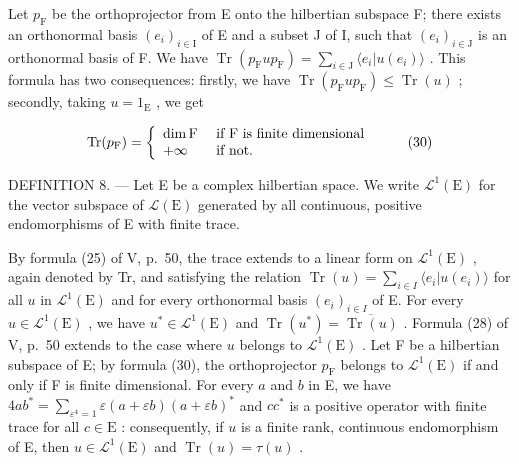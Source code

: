 Let \(p_{\mathrm{F}}\) be the orthoprojector from E onto the hilbertian subspace F; there exists an orthonormal basis \((e_i)_{i \in \mathrm{I}}\) of E and a subset J of I, such that \((e_i)_{i \in \mathrm{J}}\) is an orthonormal basis of F. We have \(\operatorname{Tr}(p_{\mathrm{F}} up_{\mathrm{F}}) = \sum_{i \in \mathrm{J}} \langle e_i | u(e_i) \rangle\) . This formula has two consequences: firstly, we have \(\operatorname{Tr}(p_{\mathrm{F}} up_{\mathrm{F}}) \leqslant \operatorname{Tr}(u)\) ; secondly, taking \(u = 1_{\mathrm{E}}\) , we get

\[
\operatorname{Tr} (p _ {\mathrm{F}}) = \left\{ \begin{array}{l l} \dim \mathrm{F} & \text { if   F   is   finite   dimensional } \\ + \infty & \text { if   not. } \end{array} \right.\tag{30}
\]

DEFINITION 8. --- Let E be a complex hilbertian space. We write \(\mathcal{L}^{1}(\mathrm{E})\) for the vector subspace of \(\mathcal{L}(\mathrm{E})\) generated by all continuous, positive endomorphisms of E with finite trace.

By formula (25) of V, p.~50, the trace extends to a linear form on \(\mathcal{L}^1 (\mathrm{E})\) , again denoted by Tr, and satisfying the relation \(\operatorname{Tr}(u) = \sum_{i\in I}\langle e_i|u(e_i)\rangle\) for all \(u\) in \(\mathcal{L}^1 (\mathrm{E})\) and for every orthonormal basis \((e_i)_{i\in I}\) of E. For every \(u\in \mathcal{L}^1 (\mathrm{E})\) , we have \(u^{*}\in \mathcal{L}^{1}(\mathrm{E})\) and \(\operatorname {Tr}(u^{*}) = \overline{\operatorname{Tr}(u)}\) . Formula (28) of V, p.~50 extends to the case where \(u\) belongs to \(\mathcal{L}^1 (\mathrm{E})\) . Let F be a hilbertian subspace of E; by formula (30), the orthoprojector \(p_{\mathrm{F}}\) belongs to \(\mathcal{L}^1 (\mathrm{E})\) if and only if F is finite dimensional. For every \(a\) and \(b\) in E, we have \(4ab^{*} = \sum_{\varepsilon^{4} = 1}\varepsilon (a + \varepsilon b)(a + \varepsilon b)^{*}\) and \(cc^{*}\) is a positive operator with finite trace for all \(c\in \mathrm{E}\) : consequently, if \(u\) is a finite rank, continuous endomorphism of E, then \(u \in \mathcal{L}^1(\mathrm{E})\) and \(\operatorname{Tr}(u) = \tau(u)\) .


